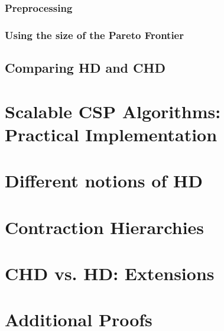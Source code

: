 \documentclass{article}
\theoremstyle{plain}
\theoremstyle{definition}
\begin{document}
\subsubsection{Preprocessing}
\label{sec:preproc}


\subsubsection{Using the size of the Pareto Frontier}


\subsection{Comparing HD and CHD}
\label{ssec:hdvschd}


\section{Scalable CSP Algorithms: \texorpdfstring{\\}{ } Practical Implementation}
\label{sec:numeric}





\appendix
\section{Different notions of HD}
\label{app:generalhd}


\section{Contraction Hierarchies}


\section{CHD vs. HD: Extensions}
\label{app:extn}



\section{Additional Proofs}
\label{sec:proofs}

\end{document}
